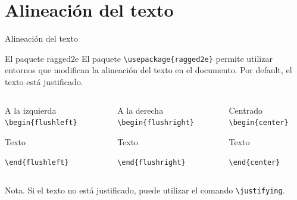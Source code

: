 \documentclass[aspectratio=169, 10pt]{beamer}
\begin{document}
    

\section{{Alineación del texto}}
\begin{frame}[fragile]{Alineación del texto}
    \begin{block}{El paquete ragged2e}
        El paquete \verb|\usepackage{ragged2e}| permite utilizar entornos que modifican la alineación del texto en el documento. Por default, el texto está justificado.
    \end{block}

    \begin{columns}
        \begin{column}{.33\linewidth} 
            \begin{alertblock}{A la izquierda} \pause
                \verb|\begin{flushleft}|
                
                    Texto
                
                \verb|\end{flushleft}|
            \end{alertblock}
        \end{column}

        \begin{column}{.33\linewidth} 
            \begin{alertblock}{A la derecha} \pause
                \verb|\begin{flushright}|
                
                    Texto
                
                \verb|\end{flushright}|
            \end{alertblock}
        \end{column}

        \begin{column}{.33\linewidth} 
            \begin{alertblock}{Centrado} \pause
                \verb|\begin{center}|
                
                    Texto
                
                \verb|\end{center}|
            \end{alertblock}
        \end{column}

        
    \end{columns}

\begin{alertblock}{Nota.}
    Si el texto no está justificado, puede utilizar el comando \verb|\justifying|.
\end{alertblock}
\end{frame}
\end{document}
